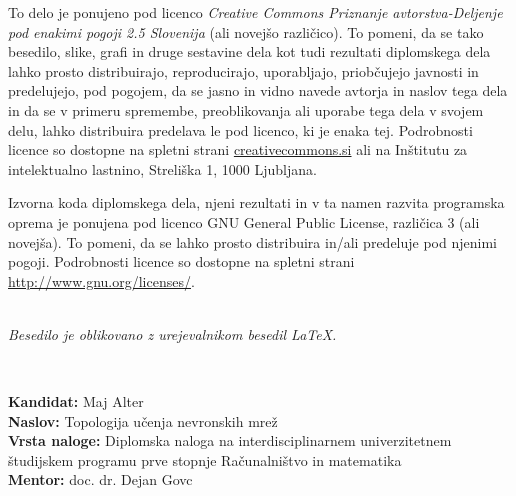 \newpage
\thispagestyle{empty}

\vspace*{5cm}
{\small \noindent
To delo je ponujeno pod licenco \textit{Creative Commons Priznanje avtorstva-Deljenje pod enakimi pogoji 2.5 Slovenija} (ali novej\v so razli\v cico).
To pomeni, da se tako besedilo, slike, grafi in druge sestavine dela kot tudi rezultati diplomskega dela lahko prosto distribuirajo,
reproducirajo, uporabljajo, priobčujejo javnosti in predelujejo, pod pogojem, da se jasno in vidno navede avtorja in naslov tega
dela in da se v primeru spremembe, preoblikovanja ali uporabe tega dela v svojem delu, lahko distribuira predelava le pod
licenco, ki je enaka tej.
Podrobnosti licence so dostopne na spletni strani \href{http://creativecommons.si}{creativecommons.si} ali na Inštitutu za
intelektualno lastnino, Streliška 1, 1000 Ljubljana.

\vspace*{1cm}
\begin{center}%
\hspace*{1ex}\hspace*{1ex}%
\end{center}
}

\vspace*{1cm}
{\small \noindent
Izvorna koda diplomskega dela, njeni rezultati in v ta namen razvita programska oprema je ponujena pod licenco GNU General Public License,
različica 3 (ali novejša). To pomeni, da se lahko prosto distribuira in/ali predeluje pod njenimi pogoji.
Podrobnosti licence so dostopne na spletni strani \url{http://www.gnu.org/licenses/}.
}

\vfill
\begin{center} 
\ \\ \vfill
{\em
Besedilo je oblikovano z urejevalnikom besedil \LaTeX.}
\end{center}

\clearemptydoublepage

\thispagestyle{empty}
\
\vfill

\bigskip
\noindent\textbf{Kandidat:} Maj Alter\\
\noindent\textbf{Naslov:} Topologija učenja nevronskih mrež\\
\noindent\textbf{Vrsta naloge:} Diplomska naloga na interdisciplinarnem univerzitetnem študijskem programu prve stopnje Računalništvo in matematika \\
\noindent\textbf{Mentor:} doc. dr. Dejan Govc\\

